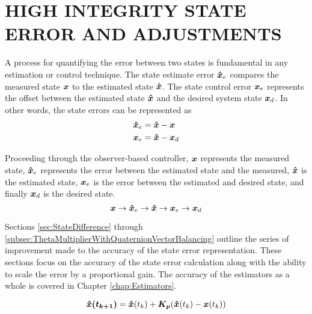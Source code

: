 
\chapter{HIGH INTEGRITY STATE ERROR AND ADJUSTMENTS}
\label{chap:StateError}

A process for quantifying the error between two states is fundamental in any estimation or control technique.  The state estimate error $\boldsymbol{\hat{x}}_e$ compares the measured state $\boldsymbol{x}$ to the estimated state $\boldsymbol{\hat{x}}$.  The state control error $\boldsymbol{x}_e$ represents the offset between the estimated state $\boldsymbol{\hat{x}}$ and the desired system state $\boldsymbol{x}_d$.  In other words, the state errors can be represented as
\begin{subequations}
  \begin{align}
    \boldsymbol{\hat{x}}_e &= \boldsymbol{\hat{x}} - \boldsymbol{x} \\
    \boldsymbol{x}_e &= \boldsymbol{\hat{x}} - \boldsymbol{x}_d
  \end{align}
  \label{eqn:StateError}
\end{subequations}

Proceeding through the observer-based controller, $\boldsymbol{x}$ represents the measured state, $\boldsymbol{\hat{x}}_e$ represents the error between the estimated state and the measured, $\boldsymbol{\hat{x}}$ is the estimated state, $\boldsymbol{x}_e$ is the error between the estimated and desired state, and finally $\boldsymbol{x}_d$ is the desired state.
\begin{equation}
  \boldsymbol{x} \to \boldsymbol{\hat{x}}_e \to \boldsymbol{\hat{x}} \to \boldsymbol{x}_e \to \boldsymbol{x}_d
\end{equation}

Sections \ref{sec:StateDifference} through \ref{subsec:ThetaMultiplierWithQuaternionVectorBalancing} outline the series of improvement made to the accuracy of the state error representation.  These sections focus on the accuracy of the state error calculation along with the ability to scale the error by a proportional gain.  The accuracy of the estimators as a whole is covered in Chapter \ref{chap:Estimators}.

\begin{equation}
  \boldsymbol{\hat{x}(t_{k+1})} = \boldsymbol{\hat{x}}(t_{k}) + \boldsymbol{K_p} ( \boldsymbol{\hat{x}}(t_{k}) - \boldsymbol{x}(t_{k}) )
  \label{eqn:PEstimatorStateDiff}
\end{equation}

